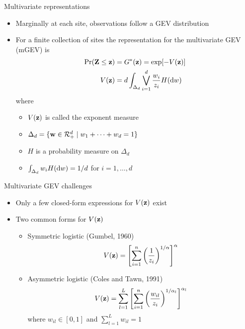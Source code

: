 \documentclass{beamer}
\begin{document}
\begin{frame}{Multivariate representations}
  \begin{itemize} \setlength{\itemsep}{1em}
    \item Marginally at each site, observations follow a GEV distribution
    \item For a finite collection of sites the representation for the multivariate GEV (mGEV) is
    \begin{align*}
      \Pr(\mbox{\bf Z} \le \mbox{\bf z})  &= G^*(\mbox{\bf z}) = \exp[-V(\mbox{\bf z})]\\
            V(\mbox{\bf z})    &= d \int_{\Delta_d} \bigvee_{i = 1}^d \frac{w_i}{z_i} H(\text{d} w)
    \end{align*}
    where
    \begin{itemize} \setlength{\itemsep}{0.25em}
      \item $V(\mbox{\bf z})$ is called the exponent measure
      \item $\Delta_d = \{ \mbox{\bf w} \in {\cal R}^d_+ \mid w_1 + \cdots + w_d = 1\}$
      \item $H$ is a probability measure on $\Delta_d$
      \item $\int_{\Delta_d}w_i H(\text{d} w) = 1 / d$ for $i = 1, \ldots, d$
    \end{itemize}
  \end{itemize}
\end{frame}

\begin{frame}{Multivariate GEV challenges}
  \begin{itemize} \setlength{\itemsep}{1em}
    \item Only a few closed-form expressions for $V(\mbox{\bf z})$ exist
    \item Two common forms for $V(\mbox{\bf z})$
    \begin{itemize}
      \item Symmetric logistic (Gumbel, 1960)
      \begin{align*}
        V(\mbox{\bf z}) = \left[\sum_{i = 1}^n \left( \frac{ 1 }{ z_i } \right)^{1/\alpha}\right]^\alpha
      \end{align*}
      \item Asymmetric logistic (Coles and Tawn, 1991)
      \begin{align*}
        V(\mbox{\bf z}) = \sum_{l = 1}^L \left[\sum_{i = 1}^n \left(\frac{w_{il}}{z_i} \right)^{1 / \alpha_l} \right]^{\alpha_l}
      \end{align*}
      where $w_{il} \in [0, 1]$ and $\sum_{l = 1}^L w_{il} = 1$
    \end{itemize}
  \end{itemize}
\end{frame}
\end{document}
